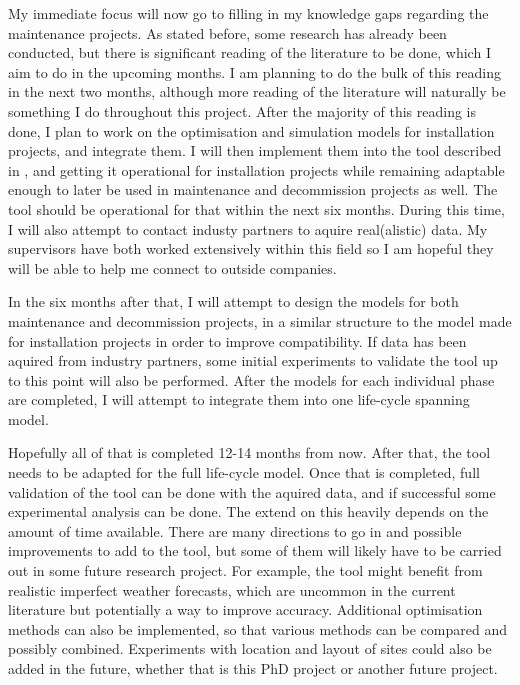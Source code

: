 \documentclass[a4paper,12pt]{article}
\begin{document}
\bigskip

My immediate focus will now go to filling in my knowledge gaps regarding the maintenance projects. As stated before, some research has already been conducted, but there is significant reading of the literature to be done, which I aim to do in the upcoming months. I am planning to do the bulk of this reading in the next two months, although more reading of the literature will naturally be something I do throughout this project. After the majority of this reading is done, I plan to work on the optimisation and simulation models for installation projects, and integrate them. I will then implement them into the tool described in , and getting it operational for installation projects while remaining adaptable enough to later be used in maintenance and decommission projects as well. The tool should be operational for that within the next six months. During this time, I will also attempt to contact industy partners to aquire real(alistic) data. My supervisors have both worked extensively within this field so I am hopeful they will be able to help me connect to outside companies.

In the six months after that, I will attempt to design the models for both maintenance and decommission projects, in a similar structure to the model made for installation projects in order to improve compatibility. If data has been aquired from industry partners, some initial experiments to validate the tool up to this point will also be performed. After the models for each individual phase are completed, I will attempt to integrate them into one life-cycle spanning model. 

Hopefully all of that is completed 12-14 months from now. After that, the tool needs to be adapted for the full life-cycle model. Once that is completed, full validation of the tool can be done with the aquired data, and if successful some experimental analysis can be done. The extend on this heavily depends on the amount of time available. There are many directions to go in and possible improvements to add to the tool, but some of them will likely have to be carried out in some future research project. For example, the tool might benefit from realistic imperfect weather forecasts, which are uncommon in the current literature but potentially a way to improve accuracy. Additional optimisation methods can also be implemented, so that various methods can be compared and possibly combined. Experiments with location and layout of sites could also be added in the future, whether that is this PhD project or another future project. 
\end{document}
